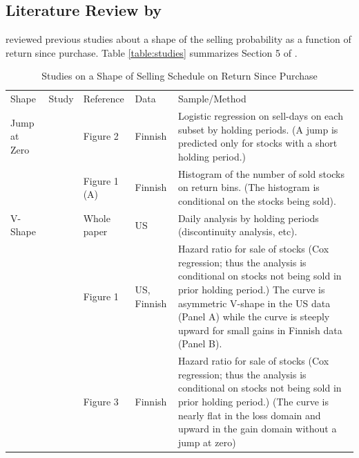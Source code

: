 \documentclass[11pt, a4paper]{article}
\begin{document}
\clearpage
\begin{appendices}
\section{Literature Review by \citet{BenDavidHirshleifer12}}
	\label{appendix:bendavid_hirshleifer}
	\renewcommand*{\thetable}{A\arabic{table}}%
	\renewcommand*{\thefigure}{A\arabic{figure}}%
	\renewcommand*{\theequation}{A\arabic{equation}}%
	\setcounter{table}{0}
	\setcounter{figure}{0}
	\setcounter{equation}{0}

\citet{BenDavidHirshleifer12} reviewed previous studies about a shape of the selling probability as a function of return since purchase. Table \ref{table:studies} summarizes Section 5 of \citet{BenDavidHirshleifer12}.

\begin{table}[H]
	\caption{Studies on a Shape of Selling Schedule on Return Since Purchase}
	\footnotesize
	\centering
	\begin{tabular}{>{\raggedright\arraybackslash}p{1.5cm} 
			>{\raggedright\arraybackslash}p{2.5cm} 
			>{\raggedright\arraybackslash}p{2.5cm} 
			>{\raggedright\arraybackslash}p{1.5cm} 
			>{\raggedright\arraybackslash}p{6cm}}
		\hline
		\addlinespace[0.1cm]
		Shape & Study & Reference & Data & Sample/Method \\ 
		\addlinespace[0.1cm]
		\hline
		\addlinespace[0.1cm]
		Jump at Zero & \citet{Kaustia10} & Figure 2 & Finnish & Logistic regression on sell-days on each subset by holding periods. (A jump is predicted only for stocks with a short holding period.)\\
		\addlinespace[0.3cm]
		             & \citet{GrinblattKeloharju01} & Figure 1 (A) & Finnish & Histogram of the number of sold stocks on return bins. (The histogram is conditional on the stocks being sold).\\
		\addlinespace[0.1cm]
		\hline
		\addlinespace[0.1cm]
		 V-Shape &  \citet{BenDavidHirshleifer12} & Whole paper & US  & Daily analysis by holding periods (discontinuity analysis, etc).  \\
		 \addlinespace[0.3cm]
		         & \citet{BarberOdean13} & Figure 1 & US, Finnish & Hazard ratio for sale of stocks (Cox regression; thus the analysis is conditional on stocks not being sold in prior holding period.) The curve is asymmetric V-shape in the US data (Panel A) while the curve is steeply upward for small gains in Finnish data (Panel B).\\
		 \addlinespace[0.3cm]
		          & \citet{SeruShumwayStoffman09} & Figure 3 & Finnish & Hazard ratio for sale of stocks (Cox regression; thus the analysis is conditional on stocks not being sold in prior holding period.) (The curve is nearly flat in the loss domain and upward in the gain domain without a jump at zero)\\

\end{tabular}
\end{table}
\end{appendices}
\end{document}
